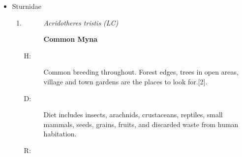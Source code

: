 \begin{itemize}
\begin{enumerate}
\begin{description}
\item[H: ]%
A common breeding resident. Can be found throughout the island except in the higher hills. Can be observed in forests and other well wooded areas of villages and towns.{[}2{]}.%
\item[D: ]%
Primary diet includes insects, encompassing large insects as well as small mammals, birds, frogs, and lizards.%
\item[R: ]%
Around Lagaan and Faculty of IT at night.%
\end{description}%
\item%
\begin{description}%
\item[]%
\textit{Otus bakkamoena (LC)}%
\item[]%
\textbf{Indian Scops{-}Owl/Collared Scops{-}Owl}%
\end{description}%
\begin{description}%
\item[H: ]%
Fairly common breeding resident found throughout the island. Uncommon in the higher hills. Avoid interior of wet evergreen forests and typically found inside well wooded areas and residantial gardens of villages and towns{[}2{]}.%
\item[D: ]%
Primary diet comprises insects, including beetles and grasshoppers. May also prey on small vertebrates such as rodents, small birds, and lizards.%
\item[R: ]%
In seetha gangula area at night. One specimen was recorded inside a building during day time.%
\end{description}%
\end{enumerate}%
\item%
Sturnidae%
\begin{enumerate}%
\item%
\begin{description}%
\item[]%
\textit{Acridotheres tristis (LC)}%
\item[]%
\textbf{Common Myna}%
\end{description}%
\begin{description}%
\item[H: ]%
Common breeding throughout. Forest edges, trees in open areas, village and town gardens are the places to look for.{[}2{]}.%
\item[D: ]%
Diet includes insects, arachnids, crustaceans, reptiles, small mammals, seeds, grains, fruits, and discarded waste from human habitation.%
\item[R: ]%

\end{description}
\end{enumerate}
\end{itemize}
